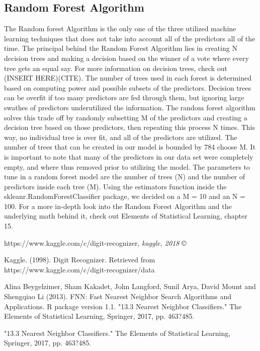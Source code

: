 \documentclass[11pt, oneside]{article}   	%
\begin{document}
\subsection{Random Forest Algorithm}
The Random forest Algorithm is the only one of the three utilized machine learning techniques that does not take into account all of the predictors all of the time. The principal behind the Random Forest Algorithm lies in creating N decision trees and making a decision based on the winner of a vote where every tree gets an equal say. For more information on decision trees, check out (INSERT HERE)(CITE). The number of trees used in each forest is determined based on computing power and possible subsets of the predictors. Decision trees can be overfit if too many predictors are fed through them, but ignoring large swathes of predictors underutilized the information. The random forest algorithm solves this trade off by randomly subsetting M of the predictors and creating a decision tree based on those predictors, then repeating this process N times. This way, no individual tree is over fit, and all of the predictors are utilized. The number of trees that can be created in our model is bounded by 784 choose M.  It is important to note that many of the predictors in our data set were completely empty, and where thus removed prior to utilizing the model. The parameters to tune in a random forest model are the number of trees (N) and the number of predictors inside each tree (M). Using the estimators function inside the skleanr.RandomForestClassifier package, we decided on a M = 10 and an N = 100. For a more in-depth look into the Random Forest Algorithm and the underlying math behind it, check out Elements of Statistical Learning, chapter 15. \cite{RandomForestBook}


\begin{thebibliography}{9}

https://www.kaggle.com/c/digit-recognizer, \textit{kaggle, 2018} \copyright
 
Kaggle. (1998). Digit Recognizer. Retrieved from https://www.kaggle.com/c/digit-recognizer/data 



Alina Beygelzimer, Sham Kakadet, John Langford, Sunil Arya, David Mount and Shengqiao
  Li (2013). FNN: Fast Nearest Neighbor Search Algorithms and Applications. R package
  version 1.1.
"13.3 Nearest Neighbor Classifiers." The Elements of Statistical Learning, Springer, 2017, pp. 463?485. 
 
"13.3 Nearest Neighbor Classifiers." The Elements of Statistical Learning, Springer, 2017, pp. 463?485.
 
\end{thebibliography}
\end{document}
